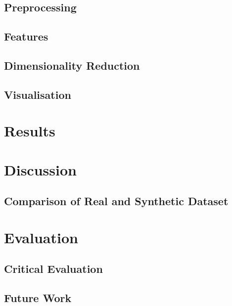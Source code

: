 \documentclass[paper=a4, fontsize=11pt]{scrartcl}	%
\numberwithin{equation}{section}															%
\numberwithin{figure}{section}																%
\numberwithin{table}{section}
\begin{document}
\subsection{Preprocessing}

\subsection{Features}

\subsection{Dimensionality Reduction}

\subsection{Visualisation}

\section{Results}

\section{Discussion}

\subsection{Comparison of Real and Synthetic Dataset}

\section{Evaluation}

\subsection{Critical Evaluation}

\subsection{Future Work}

\clearpage


\end{document}
